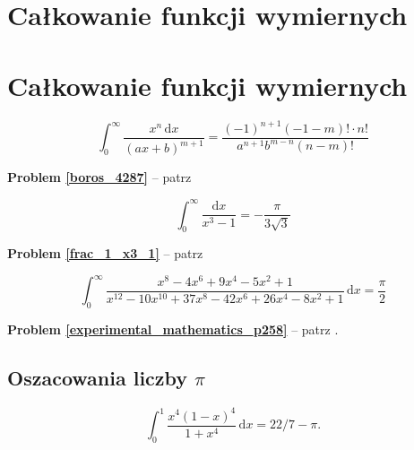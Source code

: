 %

\section{Całkowanie funkcji wymiernych}
\section{Całkowanie funkcji wymiernych}

\begin{problem}
\label{boros_4287}%
\begin{equation}
    \int_0^\infty \frac{x^n \,\mathrm{d}x}{(ax+b)^{m+1}}  = \frac{(-1)^{n+1} (-1-m)! \cdot n!}{a^{n+1} b^{m-n} (n-m)!}
\end{equation}
\end{problem}

\textbf{Problem \ref{boros_4287}} -- patrz \cite[s. 48-60]{boros04}

\begin{problem}
\label{frac_1_x3_1}%
\begin{equation}
    \int_0^\infty \frac{\mathrm{d}x}{x^3 - 1} = - \frac{\pi}{3\sqrt{3}}
\end{equation}
\end{problem}

\textbf{Problem \ref{frac_1_x3_1}} -- patrz \cite[s. 22]{nahin15}

\begin{problem}
    \label{experimental_mathematics_p258}%
\begin{equation}
    \int_0^\infty \frac{x^8-4x^6+9x^4-5x^2+1}{x^{12}-10x^{10}+37x^8-42x^6+26x^4-8x^2+1} \,\mathrm{d}x = \frac{\pi}{2}
\end{equation}
\end{problem}

\textbf{Problem \ref{experimental_mathematics_p258}} -- patrz \cite[s. 258]{bailey07}.

\subsection{Oszacowania liczby $\pi$}
\begin{problem}
\label{22_7_pi}%
\begin{equation}
    \int_0^1 \frac{x^4(1-x)^4}{1 + x^4} \,\mathrm{d}x = 22/7 - \pi.
\end{equation}
\end{problem}

